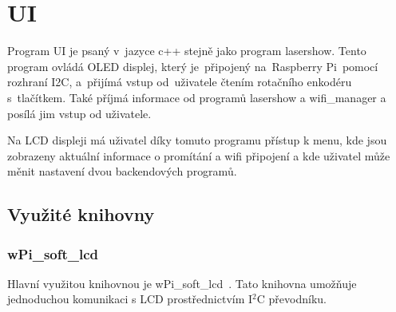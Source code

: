 \section{UI}
Program UI je psaný v~jazyce c++ stejně jako program lasershow. Tento program ovládá OLED displej, který je~připojený na~Raspberry Pi~pomocí rozhraní I2C, a~přijímá vstup od~uživatele čtením rotačního enkodéru s~tlačítkem. Také příjmá informace od programů lasershow a wifi\_manager a posílá jim vstup od uživatele.

Na LCD displeji má uživatel díky tomuto programu přístup k menu, kde jsou zobrazeny aktuální informace o promítání a wifi připojení a kde uživatel může měnit nastavení dvou backendových programů.

\subsection{Využité knihovny}
\subsubsection{wPi\_soft\_lcd}
Hlavní využitou knihovnou je wPi\_soft\_lcd~\cite{wpi-lcd}. Tato knihovna umožňuje jednoduchou komunikaci s LCD prostřednictvím I$^{2}$C převodníku.

